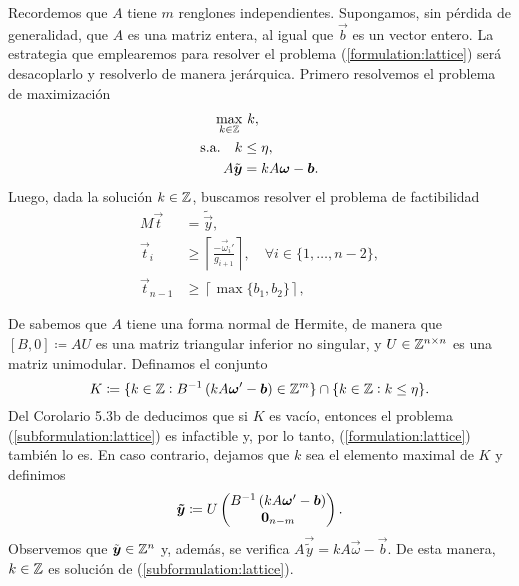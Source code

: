 Recordemos que $A$ tiene $m$ renglones independientes. Supongamos, sin pérdida de generalidad, que
$A$ es una matriz entera, al igual que $\vec{b}$ es un vector entero. La estrategia que emplearemos
para resolver el problema (\ref{formulation:lattice}) será desacoplarlo y resolverlo de manera
jerárquica. Primero resolvemos el problema de maximización
\begin{subequations}
	\label{subformulation:lattice}
	\begin{align}
		\max_{k \in \mathbb{Z}}
			& ~ k, \\
		\text{s.a.} \quad
		k &\leq \eta, \\
			A\tilde{\boldsymbol{y}} &= kA\boldsymbol{\omega} - \boldsymbol{b}.
	\end{align}
\end{subequations}
Luego, dada la solución $k \in \mathbb{Z}$, buscamos resolver el problema de factibilidad
\begin{subequations}
	\label{subformulation:feasibility}
	\begin{align}
		M\vec{t} &= \tilde{\vec{y}}, \\
		\vec{t}_i &\geq \left\lceil \frac{-\vec{\omega}_i'}{g_{i + 1}} \right\rceil, \quad
		\forall i \in \lbrace 1, \ldots, n - 2 \rbrace, \\
		\vec{t}_{n - 1} &\geq \left\lceil \max\lbrace b_1, b_2 \rbrace \right\rceil,
	\end{align}
\end{subequations}

De \cite{alex} sabemos que $A$ tiene una forma normal de Hermite, de manera que $[B, 0] \coloneq AU$
es una matriz triangular inferior no singular, y $U \in \mathbb{Z}^{n \times n}$ es una matriz unimodular.
Definamos el conjunto
\begin{equation}
	\label{eq:multiple:feasible}
	K \coloneq \lbrace k \in \mathbb{Z} \vcentcolon B^{-1}\left(k A\boldsymbol{\omega}' - \boldsymbol{b}\right) \in \mathbb{Z}^m
	\rbrace \cap \lbrace k \in \mathbb{Z} \vcentcolon k \leq \eta \rbrace.
\end{equation}
Del Corolario 5.3b de \cite{alex} deducimos que si $K$ es vacío, entonces el problema
(\ref{subformulation:lattice}) es infactible y, por lo tanto, (\ref{formulation:lattice}) también lo
es. En caso contrario, dejamos que $k$ sea el elemento maximal de $K$ y definimos
\begin{equation}
	\boldsymbol{\tilde{y}} \coloneq U\begin{pmatrix}
		B^{-1}\left(kA\boldsymbol{\omega}' - \boldsymbol{b}\right)
		\\ \boldsymbol{0}_{n - m}
	\end{pmatrix}.
\end{equation}
Observemos que $\tilde{\boldsymbol{y}} \in \mathbb{Z}^n$ y, además, se verifica $A\vec{\tilde{y}} = kA\vec{\omega}
- \vec{b}$. De esta manera, $k \in \mathbb{Z}$ es solución de (\ref{subformulation:lattice}).

